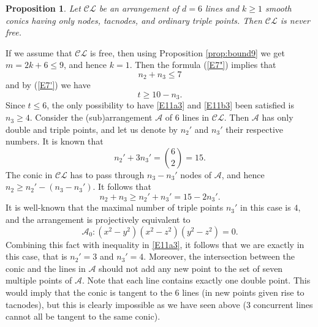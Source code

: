 \documentclass[12pt]{amsart}
\theoremstyle{plain}
\newtheorem{prop}[subsection]{Proposition}
\theoremstyle{definition}
\numberwithin{equation}{section}
\newcommand{\A}{{\mathcal A}}
\begin{document}
\begin{prop}
\label{prop11c}
Let $\mathcal{CL}$ be an arrangement of $d = 6$ lines and $k \geq 1$ smooth conics having only nodes, tacnodes, and ordinary triple points. Then  $\mathcal{CL}$ is never free.
\end{prop}
\proof
If we assume that $\mathcal{CL}$ is free, then using Proposition \ref{prop:bound9} we get $m = 2k + 6 \leq 9$, and hence $k=1$.
Then the formula (\ref{E7"}) implies that
\begin{equation}
\label{E11a3}
n_2+ n_3 \leq 7
\end{equation}
and by (\ref{E7'}) we have
\begin{equation}
\label{E11b3}
t \geq 10-n_3.
\end{equation}
Since $t \leq 6$, the only possibility to have \eqref{E11a3} and \eqref{E11b3} been satisfied is $n_3 \geq 4$.
Consider the (sub)arrangement $\mathcal{A}$ of $6$ lines in $\mathcal{CL}$. Then $\mathcal{A}$ has only double and triple points, and let us denote by $n_2'$ and $n_3'$ their respective numbers. It is known that 
\begin{equation}
\label{E11d3}
n_2'+3n_3' =\binom{6}{2}=15.
\end{equation}
The conic in $\mathcal{CL}$ has to pass through $n_3-n_3'$ nodes of $\mathcal{A}$, and hence $n_2 \geq n_2'-(n_3-n_3')$. It follows that
$$n_2+n_3 \geq n_2'+n_3' =15 - 2n_3'.$$
It is well-known that the maximal number of triple points $n_3'$ in this case is $4$, and the arrangement is projectively equivalent to
$$\A_0: (x^2-y^2)(x^2-z^2)(y^2-z^2)=0.$$
Combining this fact with inequality in \eqref{E11a3}, it follows that
we are exactly in this case, that is $n_2' = 3$ and $n_3' = 4$. Moreover, the intersection between the conic and the lines in $\mathcal{A}$ should not add any new point to the set of seven multiple points of $\mathcal{A}$. Note that each line contains exactly one double point. This would imply that the conic is tangent to the 6 lines (in new points given rise to tacnodes), but this is clearly impossible as we have seen above ($3$ concurrent lines cannot all be tangent to the same conic).
\endproof
\end{document}
